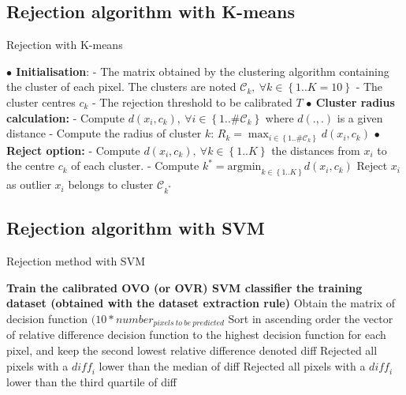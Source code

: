 \documentclass{siamart171218}
\begin{document}
\begin{appendices}
\subsection{Rejection algorithm with K-means}
\label{Annexe:Kmeans_Reject}

\begin{algorithm}[H]
	\caption{Rejection with K-means} 
	\begin{algorithmic}[1]
	    \State \textbf{$\bullet$ Initialisation}:
	    \State - The matrix obtained by the clustering algorithm containing the cluster of each pixel. The clusters are noted $\mathcal{C}_k, ~ \forall k \in \left\{1..K=10\right\}$
	    \State - The cluster centres $c_k$
	    \State - The rejection threshold to be calibrated $T$
	    \State \textbf{$\bullet$ Cluster radius calculation:}
	            \State - Compute $d(x_i,c_k), ~ \forall i \in \left\{1..\# \mathcal{C}_k\right\}$  where $d(.,.)$ is a given distance
	        \EndFor
	        \State - Compute the radius of cluster $k$: $R_k = \max_{i \in \left\{1..\# \mathcal{C}_k\right\}} d(x_i,c_k) $
	    \EndFor
	     \State \textbf{$\bullet$ Reject option:}
	        \State - Compute $d(x_i,c_k),~\forall k \in \left\{ 1..K \right\}$ the distances from $x_i$ to the centre $c_k$ of each cluster. 
	        \State - Compute $k^* = \text{argmin}_{k \in \left\{1..K\right\}} d(x_i,c_k) $
	            \State Reject $x_i$ as outlier
	       \Else
	            \State $x_i$ belongs to cluster $\mathcal{C}_{k^*}$
	        \EndIf
	    \EndFor
	\end{algorithmic} 
	\label{Algo:Reject_with_Kmeans}
\end{algorithm}

\subsection{Rejection algorithm with SVM}
\label{Annexe:SVM_reject}

\begin{algorithm}[H]
	\caption{Rejection method with SVM} 
	\begin{algorithmic}[1]
	    \State \textbf{Train the calibrated OVO (or OVR) SVM classifier the training dataset (obtained with the dataset extraction rule) }
	    \State Obtain the matrix of decision function $(10*number_{pixels \ to \ be \ predicted}$
	    \State Sort in ascending order the vector of relative difference decision function to the highest decision function for each pixel, and keep the second lowest relative difference denoted diff 
		    \State Rejected all pixels with a $\textit{diff}_i$ lower than the median of diff
	        \State Rejected all pixels with a $\textit{diff}_i$ lower than the third quartile of diff
	    \EndIf
	\end{algorithmic} 
	\label{Algo:reject_SVM}
\end{algorithm}


\end{appendices}
\end{document}
